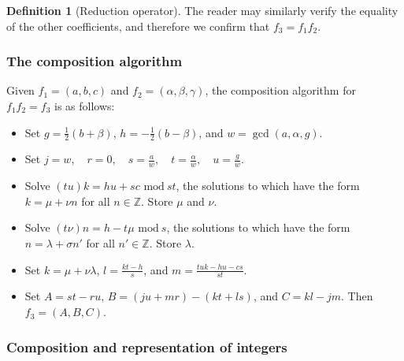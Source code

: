\documentclass{article}
\theoremstyle{definition}
\newtheorem{definition}{Definition}[section]
\theoremstyle{theorem}
\theoremstyle{example}
\theoremstyle{corollary}
\begin{document}
\begin{definition}[Reduction operator]
\bigskip

The reader may similarly verify the equality of the other coefficients, and therefore we confirm that \(f_{3} = f_{1} f_{2}\).

\bigskip

\subsubsection{The composition algorithm}

\bigskip

Given \(f_{1} = (a, b, c)\) and \(f_{2} = (\alpha, \beta, \gamma)\), the composition algorithm for \(f_{1} f_{2} = f_{3}\) is as follows:
\begin{itemize}
\item Set \(g = \frac{1}{2} (b + \beta)\), \(h = - \frac{1}{2} (b - \beta)\), and \(w = \gcd(a, \alpha, g)\).
\item Set \(j = w, \quad r = 0, \quad s = \frac{a}{w}, \quad t = \frac{\alpha}{w}, \quad u = \frac{g}{w}\).
\item Solve \((tu)k = hu + sc \, \, \textrm{mod} \ st\), the solutions to which have the form \(k = \mu + \nu n\) for all \(n \in \mathbb{Z}\). Store \(\mu\) and \(\nu\).
\item Solve \((t\nu)n = h - t\mu \, \, \textrm{mod} \ s\), the solutions to which have the form \(n = \lambda + \sigma n'\) for all \(n' \in \mathbb{Z}\). Store \(\lambda\).
\item Set \(k = \mu + \nu \lambda\), \(l = \frac{kt - h}{s}\), and \(m = \frac{tuk - hu - cs}{st}\).
\item Set \(A = s t - r u\), \(B = (j u + m r) - (k t + l s)\), and \(C = k l - j m\). Then \(f_{3} = (A, B, C)\).
\end{itemize}






\bigskip

\subsubsection{Composition and representation of integers}

\bigskip


\end{definition}
\end{document}
